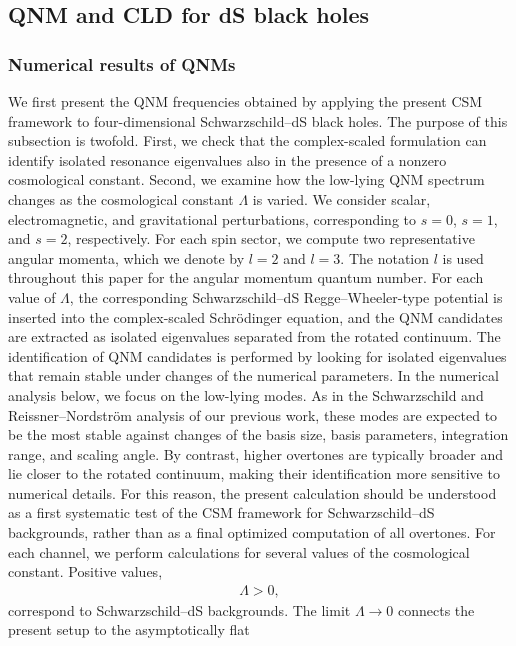 \subsection{QNM and CLD for dS black holes}\label{src:2605_03277:sec:result}
\subsubsection{Numerical results of QNMs}
We first present the QNM frequencies obtained by applying the present CSM
framework to four-dimensional Schwarzschild--dS black holes.
The purpose of this subsection is twofold.
First, we check that the complex-scaled formulation can identify isolated
resonance eigenvalues also in the presence of a nonzero cosmological constant.
Second, we examine how the low-lying QNM spectrum changes as the cosmological
constant $\Lambda$ is varied.
We consider scalar, electromagnetic, and gravitational perturbations,
corresponding to $s=0$, $s=1$, and $s=2$, respectively.
For each spin sector, we compute two representative angular momenta,
which we denote by $l=2$ and $l=3$.
The notation $l$ is used throughout this paper for the angular momentum
quantum number.
For each value of $\Lambda$, the corresponding Schwarzschild--dS
Regge--Wheeler-type potential is inserted into the complex-scaled
Schr\"odinger equation, and the QNM candidates are extracted as isolated
eigenvalues separated from the rotated continuum.
The identification of QNM candidates is performed by looking for isolated
eigenvalues that remain stable under changes of the numerical parameters.
In the numerical analysis below, we focus on the low-lying modes.
As in the Schwarzschild and Reissner--Nordstr\"om analysis of our previous
work, these modes are expected to be the most stable against changes of the
basis size, basis parameters, integration range, and scaling angle.
By contrast, higher overtones are typically broader and lie closer to the
rotated continuum, making their identification more sensitive to numerical
details.
For this reason, the present calculation should be understood as a first
systematic test of the CSM framework for Schwarzschild--dS backgrounds,
rather than as a final optimized computation of all overtones.
For each channel, we perform calculations for several values of the
cosmological constant.
Positive values,
\begin{align}
    \Lambda>0,
\end{align}
correspond to Schwarzschild--dS backgrounds.
The limit $\Lambda\to0$ connects the present setup to the asymptotically flat
